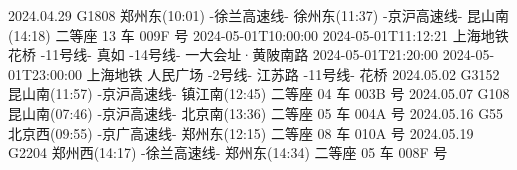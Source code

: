 2024.04.29 G1808 郑州东(10:01) -徐兰高速线- 徐州东(11:37) -京沪高速线- 昆山南(14:18) 二等座 13 车 009F 号
2024-05-01T10:00:00 2024-05-01T11:12:21 上海地铁 花桥 -11号线- 真如 -14号线- 一大会址·黄陂南路
2024-05-01T21:20:00 2024-05-01T23:00:00 上海地铁 人民广场 -2号线- 江苏路 -11号线- 花桥
2024.05.02 G3152 昆山南(11:57) -京沪高速线- 镇江南(12:45) 二等座 04 车 003B 号
2024.05.07 G108  昆山南(07:46) -京沪高速线- 北京南(13:36) 二等座 05 车 004A 号
2024.05.16 G55   北京西(09:55) -京广高速线- 郑州东(12:15) 二等座 08 车 010A 号
2024.05.19 G2204 郑州西(14:17) -徐兰高速线- 郑州东(14:34) 二等座 05 车 008F 号





